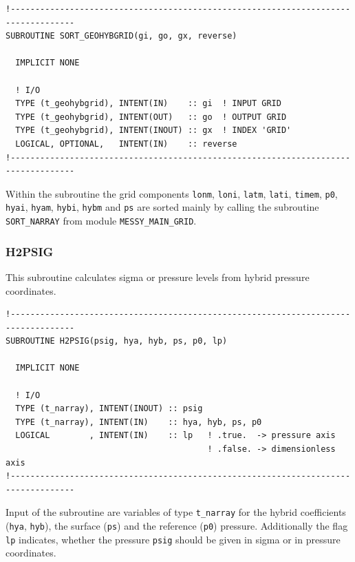 \documentclass[11pt,twoside]{article}
\begin{document}
\begin{verbatim}
!-----------------------------------------------------------------------------------
SUBROUTINE SORT_GEOHYBGRID(gi, go, gx, reverse)

  IMPLICIT NONE

  ! I/O
  TYPE (t_geohybgrid), INTENT(IN)    :: gi  ! INPUT GRID
  TYPE (t_geohybgrid), INTENT(OUT)   :: go  ! OUTPUT GRID
  TYPE (t_geohybgrid), INTENT(INOUT) :: gx  ! INDEX 'GRID'
  LOGICAL, OPTIONAL,   INTENT(IN)    :: reverse
!-----------------------------------------------------------------------------------
\end{verbatim}
Within the subroutine the grid components \verb|lonm|, \verb|loni|, 
\verb|latm|,  \verb|lati|, \verb|timem|, \verb|p0|, 
\verb|hyai|, \verb|hyam|, \verb|hybi|, \verb|hybm| and \verb|ps| are
sorted mainly by calling the subroutine \verb|SORT_NARRAY| from module
\verb|MESSY_MAIN_GRID|.

\subsubsection{H2PSIG\label{H2PSIG}}
This subroutine calculates sigma or pressure levels from hybrid
pressure coordinates. 
\begin{verbatim}
!-----------------------------------------------------------------------------------
SUBROUTINE H2PSIG(psig, hya, hyb, ps, p0, lp)

  IMPLICIT NONE

  ! I/O
  TYPE (t_narray), INTENT(INOUT) :: psig
  TYPE (t_narray), INTENT(IN)    :: hya, hyb, ps, p0
  LOGICAL        , INTENT(IN)    :: lp   ! .true.  -> pressure axis
                                         ! .false. -> dimensionless axis
!-----------------------------------------------------------------------------------
\end{verbatim}
Input of the subroutine are variables of type \verb|t_narray| for the hybrid 
coefficients (\verb|hya|, \verb|hyb|), the surface (\verb|ps|) and the
reference (\verb|p0|) pressure. Additionally the flag \verb|lp| indicates,
 whether the pressure \verb|psig| should be given in sigma  or in  pressure  
coordinates.
\end{document}

